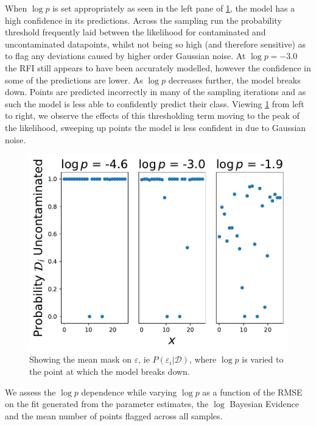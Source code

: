 \documentclass[fleqn,usenatbib]{mnras}
\begin{document}
When $\log p$ is set appropriately as seen in the left pane of \cref{fig:tri_plot}, the model has a high confidence in its predictions. Across the sampling run the probability threshold frequently laid between the likelihood for contaminated and uncontaminated datapoints, whilst not being so high (and therefore sensitive) as to flag any deviations caused by higher order Gaussian noise. At $\log p = -3.0$ the RFI still appears to have been accurately modelled, however the confidence in some of the predictions are lower. As $\log p$ decreases further, the model breaks down. Points are predicted incorrectly in many of the sampling iterations and as such the model is less able to confidently predict their class. Viewing \cref{fig:tri_plot} from left to right, we observe the effects of this thresholding term moving to the peak of the likelihood, sweeping up points the model is less confident in due to Gaussian noise.
\begin{figure}
	\includegraphics[width=\columnwidth]{f_tri_plot_3_horiz.pdf}
    \caption{Showing the mean mask on $\varepsilon$, ie $P(\varepsilon_i|\mathcal{D})$, where $\log p$ is varied to the point at which the model breaks down.}
    \label{fig:tri_plot}
\end{figure}
We assess the $\log p$ dependence while varying $\log p$ as a function of the RMSE on the fit generated from the parameter estimates, the $\log$ Bayesian Evidence and the mean number of points flagged across all samples. 
\end{document}
